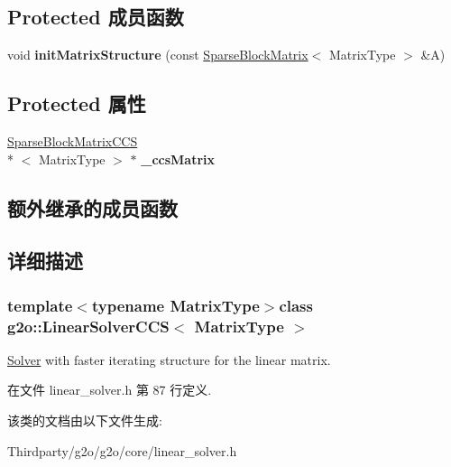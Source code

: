 \subsection*{Protected 成员函数}
\begin{DoxyCompactItemize}
\item 
\hypertarget{classg2o_1_1LinearSolverCCS_a070138d7e2a68a576e015f5073a4a464}{void {\bfseries init\-Matrix\-Structure} (const \hyperlink{classg2o_1_1SparseBlockMatrix}{Sparse\-Block\-Matrix}$<$ Matrix\-Type $>$ \&A)}\label{classg2o_1_1LinearSolverCCS_a070138d7e2a68a576e015f5073a4a464}

\end{DoxyCompactItemize}
\subsection*{Protected 属性}
\begin{DoxyCompactItemize}
\item 
\hypertarget{classg2o_1_1LinearSolverCCS_a07f0df9a6012d567e26a89063c53aa12}{\hyperlink{classg2o_1_1SparseBlockMatrixCCS}{Sparse\-Block\-Matrix\-C\-C\-S}\\*
$<$ Matrix\-Type $>$ $\ast$ {\bfseries \-\_\-ccs\-Matrix}}\label{classg2o_1_1LinearSolverCCS_a07f0df9a6012d567e26a89063c53aa12}

\end{DoxyCompactItemize}
\subsection*{额外继承的成员函数}


\subsection{详细描述}
\subsubsection*{template$<$typename Matrix\-Type$>$class g2o\-::\-Linear\-Solver\-C\-C\-S$<$ Matrix\-Type $>$}

\hyperlink{classg2o_1_1Solver}{Solver} with faster iterating structure for the linear matrix. 

在文件 linear\-\_\-solver.\-h 第 87 行定义.



该类的文档由以下文件生成\-:\begin{DoxyCompactItemize}
\item 
Thirdparty/g2o/g2o/core/linear\-\_\-solver.\-h\end{DoxyCompactItemize}
